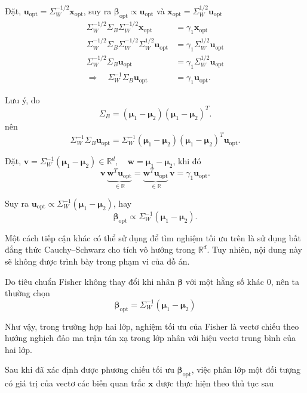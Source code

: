 Đặt, $
\bm{u}_{\text{opt}}
=
\Sigma_W^{-1/2}\bm{x}_{\text{opt}}
$, suy ra $\bm{\beta}_{\text{opt}}
\propto
\bm{u}_{\text{opt}}$ và $\bm{x}_{\text{opt}}
=
\Sigma_W^{1/2}\bm{u}_{\text{opt}}$
\[
\begin{aligned}
	\Sigma_W^{-1/2}\Sigma_B\Sigma_W^{-1/2}
	\bm{x}_{\text{opt}}
	&=
	\gamma_1\bm{x}_{\text{opt}} \\[0.2cm]
	\Sigma_W^{-1/2}\Sigma_B\Sigma_W^{-1/2}
	\Sigma_W^{1/2}\bm{u}_{\text{opt}}
	&=
	\gamma_1\Sigma_W^{1/2}\bm{u}_{\text{opt}} \\[0.2cm]
	\Sigma_W^{-1/2}\Sigma_B\bm{u}_{\text{opt}}
	&=
	\gamma_1\Sigma_W^{1/2}\bm{u}_{\text{opt}} \\[0.2cm]
	\Rightarrow \quad
	\Sigma_W^{-1}\Sigma_B\bm{u}_{\text{opt}}
	&=
	\gamma_1\bm{u}_{\text{opt}}.
\end{aligned}
\]

Lưu ý, do
\[
\Sigma_B
=
(\bm{\mu}_1-\bm{\mu}_2)(\bm{\mu}_1-\bm{\mu}_2)^T.
\]
nên
\[
\Sigma_W^{-1}
\Sigma_B
\bm{u}_{\text{opt}}
=
\Sigma_W^{-1}
(\bm{\mu}_1-\bm{\mu}_2)(\bm{\mu}_1-\bm{\mu}_2)^T
\bm{u}_{\text{opt}}.
\]

Đặt, $\bm{v}
=
\Sigma_W^{-1}(\bm{\mu}_1-\bm{\mu}_2)
\in \mathbb{R}^d,
\quad
\bm{w}
=
\bm{\mu}_1-\bm{\mu}_2$, khi đó
\[
\bm{v}\,
\underbrace{\bm{w}^T\bm{u}_{\text{opt}}}_{\in \mathbb{R}}
=
\underbrace{\bm{w}^T\bm{u}_{\text{opt}}}_{\in \mathbb{R}}\,
\bm{v}
=
\gamma_1
\bm{u}_{\text{opt}}.
\]

Suy ra $\bm{u}_{\text{opt}}
\propto
\Sigma_W^{-1}(\bm{\mu}_1-\bm{\mu}_2)$, hay
\[
\bm{\beta}_{\text{opt}}
\propto
\Sigma_W^{-1}(\bm{\mu}_1-\bm{\mu}_2).
\]

Một cách tiếp cận khác có thể sử dụng để tìm nghiệm tối ưu trên là sử dụng bất đẳng thức Cauchy--Schwarz cho tích vô hướng trong $\mathbb{R}^d$. Tuy nhiên, nội dung này sẽ không được trình bày trong phạm vi của đồ án.

Do tiêu chuẩn Fisher không thay đổi khi nhân $\bm{\beta}$ với một hằng số khác $0$, nên ta thường chọn
\[
\boxed{
	\bm{\beta}_{\text{opt}}
	=
	\Sigma_W^{-1}(\bm{\mu}_1-\bm{\mu}_2)
}
\]

Như vậy, trong trường hợp hai lớp, nghiệm tối ưu của Fisher là vectơ chiếu theo hướng nghịch đảo ma trận tán xạ trong lớp nhân với hiệu vectơ trung bình của hai lớp.

\hspace*{0.5cm}Sau khi đã xác định được phương chiếu tối ưu $\bm{\beta}_{\text{opt}}$, việc phân lớp một đối tượng có giá trị của vectơ các biến quan trắc $\bm{x}$ được thực hiện theo thủ tục sau

